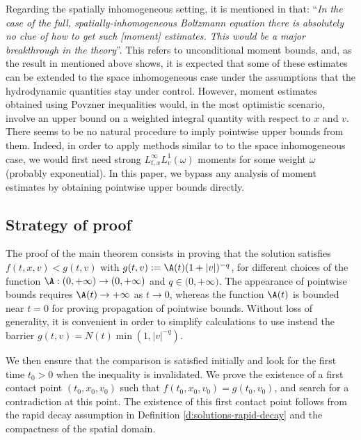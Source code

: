 Regarding the spatially inhomogeneous setting, it is mentioned in
\cite[Chap.\,2, \S2]{villani-book} that: ``\textit{In the case
of the full, spatially-inhomogeneous Boltzmann equation there is
absolutely no clue of how to get such [moment] estimates. This would
be a major breakthrough in the theory}''. This refers to
unconditional moment bounds, and, as the result in
\cite[\S 5]{GMM} mentioned above shows, it is expected that some
of these estimates can be extended to the space inhomogeneous case
under the assumptions that the hydrodynamic quantities stay under
control. However, moment estimates obtained using Povzner inequalities
would, in the most optimistic scenario, involve an upper bound on a
weighted integral quantity with respect to $x$ and $v$. There seems to
be no natural procedure to imply pointwise upper bounds from
them. Indeed, in order to apply methods similar to
\cite{gamba-panferov-villani-2009,bobylev2017upper,gamba2017pointwise}
to the space inhomogeneous case, we would first need strong
$L^\infty_{t,x} L^1_v(\omega)$ moments for some weight $\omega$
(probably exponential). In this paper, we bypass any analysis of
moment estimates by obtaining pointwise upper bounds directly.

\subsection{Strategy of proof}

The proof of the main theorem consists in proving that the solution
satisfies $f(t,x,v) < g(t,v)$ with $g(t,v) := \A(t) (1 + |v|)^{-q}$,
for different choices of the function
$\A: (0,+\infty) \to (0,+\infty)$ and $q \in \mathbb (0,+\infty)$. The
appearance of pointwise bounds requires $\A(t) \to +\infty$ as
$t \to 0$, whereas the function $\A(t)$ is bounded near $t=0$ for
proving propagation of pointwise bounds. Without loss of generality,
it is convenient in order to simplify calculations to use instead the
barrier $g(t,v) = N(t) \min(1,|v|^{-q})$.

We then ensure that the comparison is satisfied initially and look for
the first time $t_0 >0$ when the inequality is invalidated. We prove
the existence of a first contact point $(t_0,x_0,v_0)$ such that
$f(t_0,x_0,v_0) = g(t_0,v_0)$, and search for a
contradiction at this point. The existence of this first contact point
follows from the rapid decay assumption in Definition
\ref{d:solutions-rapid-decay} and the compactness of the spatial domain.

